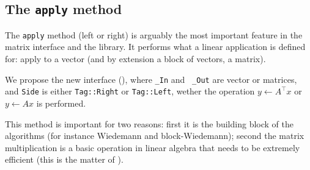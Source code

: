 %
\subsection{The \texttt{apply} method}\label{ssec:apply}
%
%
\par
%
The \texttt{apply} method (left or right) is arguably the most important
feature in the matrix interface and the \linbox library. It performs what a
linear application is defined for: apply to a vector (and by extension  a block
of vectors, \ie a matrix).
%
\par
%
We propose the new interface (), where {\tt \_In} and {\tt
\_Out} are vector or matrices, and {\tt Side} is either {\tt Tag::Right} or
{\tt Tag::Left}, wether the operation $y \gets A^{\top} x$ or  $y \gets A x$ is
performed.
%

%
This method is important for two reasons: first it is the building block of the
\applin algorithms (for instance Wiedemann and block-Wiedemann); second the
matrix multiplication is a basic operation in linear algebra that needs to be
extremely efficient (this is the matter of ).
%
%
%
